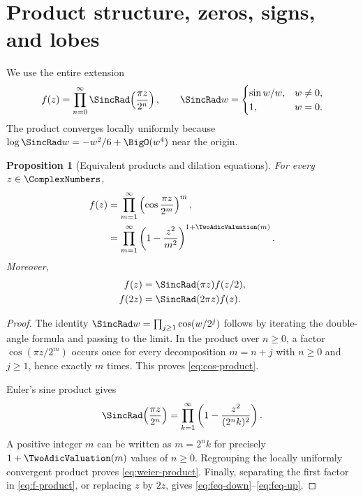 \documentclass[11pt,oneside]{article}
\newtheorem{proposition}[theorem]{Proposition}
\theoremstyle{definition}
\theoremstyle{remark}
\begin{document}
\section{Product structure, zeros, signs, and lobes}

We use the entire extension
\begin{equation}
 f(z)=\prod_{n=0}^{\infty}\SincRad\!\left(\frac{\pi z}{2^n}\right),
 \qquad \SincRad w=\begin{cases}\sin w/w,&w\ne0,\\1,&w=0.\end{cases}
 \label{eq:f-product}
\end{equation}
The product converges locally uniformly because
$\log\SincRad w=-w^2/6+\BigO(w^4)$ near the origin.

\begin{proposition}[Equivalent products and dilation equations]
For every $z\in\ComplexNumbers$,
\begin{align}
 f(z)
 &=\prod_{m=1}^{\infty}
   \left(\cos\frac{\pi z}{2^m}\right)^m,                    \label{eq:cos-product}\\
 &=\prod_{m=1}^{\infty}
   \left(1-\frac{z^2}{m^2}\right)^{1+\TwoAdicValuation(m)}.             \label{eq:weier-product}
\end{align}
Moreover,
\begin{align}
 f(z)&=\SincRad(\pi z)f(z/2),                                  \label{eq:feq-down}\\
 f(2z)&=\SincRad(2\pi z)f(z).                                  \label{eq:feq-up}
\end{align}
\end{proposition}

\begin{proof}
The identity $\SincRad w=\prod_{j\ge1}\cos(w/2^j)$ follows by iterating the
double-angle formula and passing to the limit.  In the product over $n\ge0$,
a factor $\cos(\pi z/2^m)$ occurs once for every decomposition $m=n+j$ with
$n\ge0$ and $j\ge1$, hence exactly $m$ times.  This proves
\eqref{eq:cos-product}.

Euler's sine product gives
\[
 \SincRad\!\left(\frac{\pi z}{2^n}\right)
 =\prod_{k=1}^{\infty}\left(1-\frac{z^2}{(2^nk)^2}\right).
\]
A positive integer $m$ can be written as $m=2^nk$ for precisely
$1+\TwoAdicValuation(m)$ values of $n\ge0$.  Regrouping the locally uniformly convergent
product proves \eqref{eq:weier-product}.  Finally, separating the first factor
in \eqref{eq:f-product}, or replacing $z$ by $2z$, gives
\eqref{eq:feq-down}--\eqref{eq:feq-up}.
\end{proof}
\end{document}
